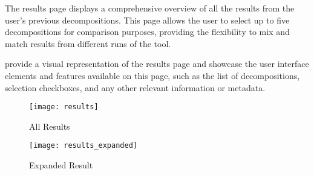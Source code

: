 The results page displays a comprehensive overview of all the results from the
user's previous decompositions. This page allows the user to select up to five
decompositions for comparison purposes, providing the flexibility to mix and
match results from different runs of the tool.

 provide a visual representation of the
results page and showcase the user interface elements and features available on
this page, such as the list of decompositions, selection checkboxes, and any
other relevant information or metadata.

\begin{figure*}[!htb]
  \caption{All Results}
  \label{fig:results}
  \centering
  \texttt{[image: results]}
\end{figure*}
\begin{figure*}[!htb]
  \caption{Expanded Result}
  \label{fig:expanded_result}
  \centering
  \texttt{[image: results\_expanded]}
\end{figure*}
